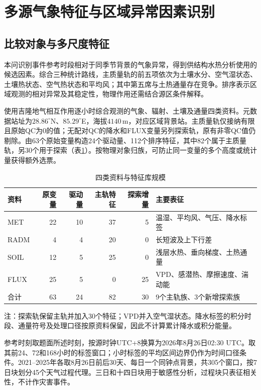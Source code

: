 \section{多源气象特征与区域异常因素识别}
\label{q1-sec}

\subsection{比较对象与多尺度特征}

本问识别事件参考时段相对于同季节背景的气象异常，得到供结构水热分析使用的候选因素。综合三种统计路线，主质量轨的前五项依次为土壤水分、空气湿状态、土壤热状态、空气热状态和平均风；其中第五席与土热通量存在竞争。排序表示区域观测的相对异常及其稳定性，物理作用还需结合源区条件解释。

使用吉隆地气相互作用逐小时综合观测的气象、辐射、土壤及通量四类资料\cite{common-waternet}。元数据站址为$28.86^\circ$N、$85.29^\circ$E，海拔$4140\,\mathrm m$，对应区域背景站。主质量轨仅接纳有限且原始QC为0的值；无配对QC的降水和FLUX变量另列探索轨，原有非零QC值仍剔除。由63个原始变量构造24个驱动量、112个排序特征，其中82个属于主质量轨，另30个用于探索（表\ref{q1-tab-features}）。按物理对象归族，可防止同一变量的多个高度或统计量获得额外选票。

\begin{table}[htbp]
\centering\small
\caption{四类资料与特征库规模}
\label{q1-tab-features}
\begin{tabular}{lrrrrl}
\toprule
资料 & 原变量 & 驱动量 & 主轨特征 & 探索增量 & 主要表征\\
\midrule
MET  &22&10&37&5&温湿、平均风、气压、降水标签\\
RADM &4&4&20&0&长短波及上下行差\\
SOIL &12&5&25&0&浅层水热、垂向梯度、土热通量\\
FLUX &25&5&0&25&VPD、感潜热、摩擦速度、湍动能\\
\midrule
合计 &63&24&82&30&9个主轨族、3个新增探索族\\
\bottomrule
\end{tabular}
\parbox{\linewidth}{\footnotesize 注：探索轨保留主轨并加入30个特征；VPD并入空气湿状态。降水标签的积分时段、通量符号及处理口径按原资料保留，因此不计算累计降水或积分能量。}
\end{table}

参考时刻取题面所述时刻，按源时钟UTC+8换算为2026年8月26日02:30 UTC。取其前24、72和168小时的标签窗口；小时标签的平均区间边界仍作为时间口径条件。2021--2025年各取8月26日前后30天、每日一个同钟点背景，共305个窗口，按7日块划分45个天气过程代理。三日和十四日块用于敏感性分析，过程块只表征相关性，不计作灾害事件。


